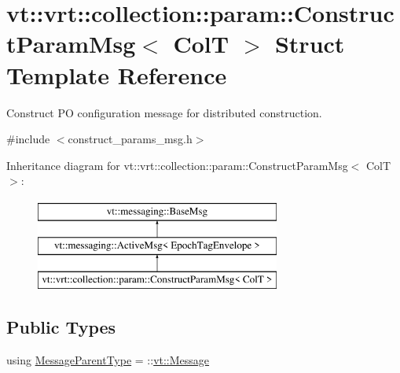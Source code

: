 \hypertarget{structvt_1_1vrt_1_1collection_1_1param_1_1_construct_param_msg}{}\section{vt\+:\+:vrt\+:\+:collection\+:\+:param\+:\+:Construct\+Param\+Msg$<$ ColT $>$ Struct Template Reference}
\label{structvt_1_1vrt_1_1collection_1_1param_1_1_construct_param_msg}


Construct PO configuration message for distributed construction.  




{\ttfamily \#include $<$construct\+\_\+params\+\_\+msg.\+h$>$}

Inheritance diagram for vt\+:\+:vrt\+:\+:collection\+:\+:param\+:\+:Construct\+Param\+Msg$<$ ColT $>$\+:\begin{figure}[H]
\begin{center}
\leavevmode
\includegraphics[height=3.000000cm]{structvt_1_1vrt_1_1collection_1_1param_1_1_construct_param_msg}
\end{center}
\end{figure}
\subsection*{Public Types}
\begin{DoxyCompactItemize}
\item 
using \hyperlink{structvt_1_1vrt_1_1collection_1_1param_1_1_construct_param_msg_aa9be274634c6c40cf8011b01ca6a8f47}{Message\+Parent\+Type} = \+::\hyperlink{namespacevt_a3a3ddfef40b4c90915fa43cdd5f129ea}{vt\+::\+Message}
\end{DoxyCompactItemize}
